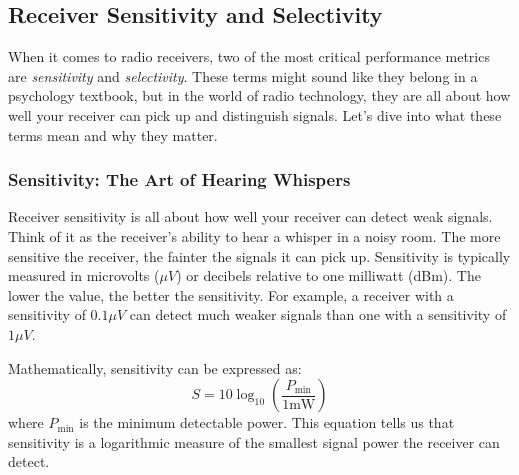 \subsection{Receiver Sensitivity and Selectivity}
\label{subsec:rx-sense-select}

When it comes to radio receivers, two of the most critical performance metrics are \textit{sensitivity} and \textit{selectivity}. These terms might sound like they belong in a psychology textbook, but in the world of radio technology, they are all about how well your receiver can pick up and distinguish signals. Let’s dive into what these terms mean and why they matter.

\subsubsection*{Sensitivity: The Art of Hearing Whispers}
Receiver sensitivity is all about how well your receiver can detect weak signals. Think of it as the receiver’s ability to hear a whisper in a noisy room. The more sensitive the receiver, the fainter the signals it can pick up. Sensitivity is typically measured in microvolts ($\mu V$) or decibels relative to one milliwatt (dBm). The lower the value, the better the sensitivity. For example, a receiver with a sensitivity of $0.1 \mu V$ can detect much weaker signals than one with a sensitivity of $1 \mu V$.

Mathematically, sensitivity can be expressed as:
\begin{equation}
    S = 10 \log_{10} \left( \frac{P_{\text{min}}}{1 \text{mW}} \right)
    \label{eq:sensitivity}
\end{equation}
where $P_{\text{min}}$ is the minimum detectable power. This equation tells us that sensitivity is a logarithmic measure of the smallest signal power the receiver can detect.


